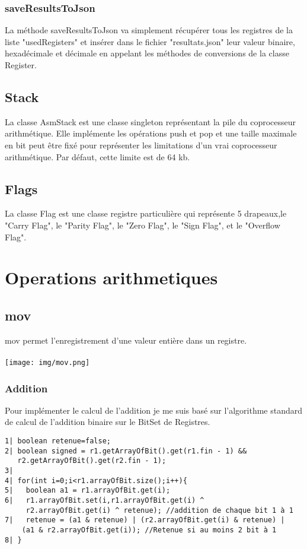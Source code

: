 \documentclass{article}
\begin{document}
\subsubsection{saveResultsToJson}

La méthode saveResultsToJson va simplement récupérer tous les registres de la liste "usedRegisters" et insérer dans le fichier "resultats.json"
leur valeur binaire, hexadécimale et décimale en appelant les méthodes de conversions de la classe Register.


\subsection{Stack}

La classe AsmStack est une classe singleton représentant la pile du coprocesseur arithmétique. Elle implémente les opérations push et pop et
une taille maximale en bit peut être fixé pour représenter les limitations d'un vrai coprocesseur arithmétique. Par défaut, cette limite est de 64 kb.

\subsection{Flags}

La classe Flag est une classe registre particulière qui représente 5 drapeaux,le "Carry Flag", le "Parity Flag", le "Zero Flag", le "Sign Flag", et le "Overflow Flag".

\section{Operations arithmetiques}
\subsection{mov}
mov permet l'enregistrement d'une valeur entière dans un registre.
\\
\\
\texttt{[image: img/mov.png]}

\newpage
\subsubsection{Addition}
Pour implémenter le calcul de l'addition je me suis basé sur l'algorithme standard de calcul de l'addition binaire sur le BitSet de Registres.

\begin{verbatim}
1| boolean retenue=false;
2| boolean signed = r1.getArrayOfBit().get(r1.fin - 1) &&
   r2.getArrayOfBit().get(r2.fin - 1);
3|
4| for(int i=0;i<r1.arrayOfBit.size();i++){
5|   boolean a1 = r1.arrayOfBit.get(i);
6|   r1.arrayOfBit.set(i,r1.arrayOfBit.get(i) ^
     r2.arrayOfBit.get(i) ^ retenue); //addition de chaque bit 1 à 1
7|   retenue = (a1 & retenue) | (r2.arrayOfBit.get(i) & retenue) |
    (a1 & r2.arrayOfBit.get(i)); //Retenue si au moins 2 bit à 1
8| }
\end{verbatim}
\end{document}
